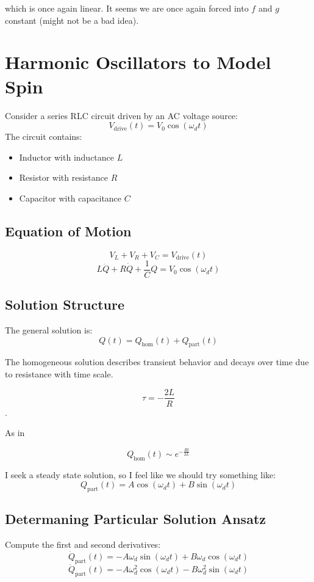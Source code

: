 \documentclass{article}
\begin{document}
which is once again linear. It seems we are once again forced into $f$ and $g$ constant (might not be a bad idea).


\section{Harmonic Oscillators to Model Spin}

Consider a series RLC circuit driven by an AC voltage source:
\[
V_{\text{drive}}(t) = V_0 \cos(\omega_d t)
\]
The circuit contains:
\begin{itemize}
  \item Inductor with inductance $L$
  \item Resistor with resistance $R$
  \item Capacitor with capacitance $C$
\end{itemize}

\subsection{Equation of Motion}
\[
V_L + V_R + V_C = V_{\text{drive}}(t)
\]
\[
\boxed{L \ddot{Q} + R \dot{Q} + \frac{1}{C} Q = V_0 \cos(\omega_d t)}
\]

\subsection{Solution Structure}

The general solution is:
\[
Q(t) = Q_{\text{hom}}(t) + Q_{\text{part}}(t)
\]

The homogeneous solution describes transient behavior and decays over time due to resistance with time scale.

\[\tau = -\frac{2L}{R}\].

As in 

\[Q_{\text{hom}}(t) \sim e^{-\frac{Rt}{2L}}\]

I seek a steady state solution, so I feel like we should try something like:
\[
Q_{\text{part}}(t) = A \cos(\omega_d t) + B \sin(\omega_d t)
\]

\subsection{Determaning Particular Solution Ansatz}
Compute the first and second derivatives:
\[
\dot{Q}_{\text{part}}(t) = -A \omega_d \sin(\omega_d t) + B \omega_d \cos(\omega_d t)
\]
\[
\ddot{Q}_{\text{part}}(t) = -A \omega_d^2 \cos(\omega_d t) - B \omega_d^2 \sin(\omega_d t)
\]
\end{document}

